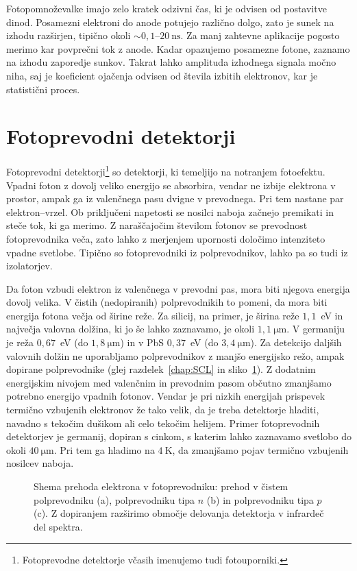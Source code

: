 Fotopomnoževalke imajo zelo kratek odzivni čas, ki je odvisen od postavitve dinod. Posamezni 
elektroni do anode potujejo različno dolgo, zato je sunek na izhodu 
razširjen, tipično okoli $\sim 0,1$--$20~\si{\nano\second}$.  
Za manj zahtevne aplikacije pogosto merimo kar povprečni tok z anode. Kadar opazujemo
posamezne fotone, zaznamo na izhodu zaporedje sunkov. Takrat lahko 
amplituda izhodnega signala močno niha, saj je koeficient ojačenja 
odvisen od števila izbitih elektronov, kar je statistični proces. 

\section{Fotoprevodni detektorji}
Fotoprevodni detektorji\footnote{Fotoprevodne detektorje včasih imenujemo tudi fotouporniki.} 
so detektorji, ki temeljijo na notranjem fotoefektu.
Vpadni foton z dovolj veliko energijo se absorbira, vendar ne izbije elektrona v prostor, 
ampak ga iz valenčnega pasu dvigne v prevodnega. Pri tem nastane par elektron--vrzel. 
Ob priključeni napetosti se nosilci naboja začnejo premikati in steče tok, 
ki ga merimo. Z naraščajočim številom fotonov se prevodnost fotoprevodnika veča, 
zato lahko z merjenjem upornosti določimo 
intenziteto vpadne svetlobe. Tipično so fotoprevodniki iz polprevodnikov, 
lahko pa so tudi iz izolatorjev. 

Da foton vzbudi elektron iz valenčnega v prevodni pas, mora biti njegova energija dovolj velika. 
V čistih (nedopiranih) polprevodnikih to pomeni, da mora biti energija fotona večja od 
širine reže. Za silicij, na primer, je širina reže $1,1$~eV in največja
valovna dolžina, ki jo še lahko zaznavamo, je okoli 
$1,1~\si{\micro\meter}$. V germaniju je reža $0,67$~eV (do $1,8~\si{\micro\meter}$) in v 
PbS $0,37$~eV (do $3,4~\si{\micro\meter}$). 
Za detekcijo daljših valovnih dolžin ne uporabljamo polprevodnikov
z manjšo energijsko režo, ampak dopirane polprevodnike (glej razdelek~\ref{chap:SCL} 
in sliko~\ref{fig:FPrevodnik}). 
Z dodatnim energijskim nivojem med valenčnim in prevodnim pasom občutno zmanjšamo 
potrebno energijo vpadnih fotonov. Vendar je pri  nizkih energijah prispevek termično 
vzbujenih elektronov že tako velik, da je treba detektorje hladiti, navadno s tekočim
dušikom ali celo tekočim helijem. Primer fotoprevodnih detektorjev je germanij, dopiran s cinkom, 
s katerim lahko zaznavamo svetlobo do okoli $40~\si{\micro\meter}$. Pri tem ga hladimo
na $4~\si{\kelvin}$, da zmanjšamo pojav termično vzbujenih nosilcev naboja. 
\begin{figure}[h]
\centering
\def\svgwidth{150truemm} 

\caption{Shema prehoda elektrona v fotoprevodniku: prehod v čistem polprevodniku (a), 
polprevodniku tipa $n$ (b) in polprevodniku tipa $p$ (c). 
Z dopiranjem razširimo območje delovanja detektorja v infrardeč del spektra. }
\label{fig:FPrevodnik}
\end{figure}

